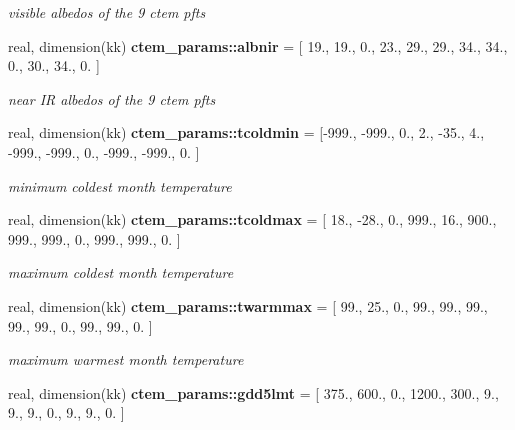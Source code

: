 \begin{DoxyCompactItemize}
\begin{DoxyCompactList}\small\item\em visible albedos of the 9 ctem pfts \end{DoxyCompactList}\item 
\hypertarget{namespacectem__params_a40fb68ad0ca75f0de54aa2ced6257788}{}real, dimension(kk) {\bfseries ctem\+\_\+params\+::albnir} = \mbox{[} 19., 19., 0., 23., 29., 29., 34., 34., 0., 30., 34., 0. \mbox{]}\label{namespacectem__params_a40fb68ad0ca75f0de54aa2ced6257788}

\begin{DoxyCompactList}\small\item\em near I\+R albedos of the 9 ctem pfts \end{DoxyCompactList}\item 
\hypertarget{namespacectem__params_aa39eead45599d5797ad7bd80168fb657}{}real, dimension(kk) {\bfseries ctem\+\_\+params\+::tcoldmin} = \mbox{[}-\/999., -\/999., 0., 2., -\/35., 4., -\/999., -\/999., 0., -\/999., -\/999., 0. \mbox{]}\label{namespacectem__params_aa39eead45599d5797ad7bd80168fb657}

\begin{DoxyCompactList}\small\item\em minimum coldest month temperature \end{DoxyCompactList}\item 
\hypertarget{namespacectem__params_a931982e7bbae83e4ebc020aef5e82785}{}real, dimension(kk) {\bfseries ctem\+\_\+params\+::tcoldmax} = \mbox{[} 18., -\/28., 0., 999., 16., 900., 999., 999., 0., 999., 999., 0. \mbox{]}\label{namespacectem__params_a931982e7bbae83e4ebc020aef5e82785}

\begin{DoxyCompactList}\small\item\em maximum coldest month temperature \end{DoxyCompactList}\item 
\hypertarget{namespacectem__params_a72a50f8b26e68efe36fe078e192726b7}{}real, dimension(kk) {\bfseries ctem\+\_\+params\+::twarmmax} = \mbox{[} 99., 25., 0., 99., 99., 99., 99., 99., 0., 99., 99., 0. \mbox{]}\label{namespacectem__params_a72a50f8b26e68efe36fe078e192726b7}

\begin{DoxyCompactList}\small\item\em maximum warmest month temperature \end{DoxyCompactList}\item 
\hypertarget{namespacectem__params_a6a7e5c14d01e4234fb7a0ee3fb795c34}{}real, dimension(kk) {\bfseries ctem\+\_\+params\+::gdd5lmt} = \mbox{[} 375., 600., 0., 1200., 300., 9., 9., 9., 0., 9., 9., 0. \mbox{]}\label{namespacectem__params_a6a7e5c14d01e4234fb7a0ee3fb795c34}


\end{DoxyCompactItemize}
